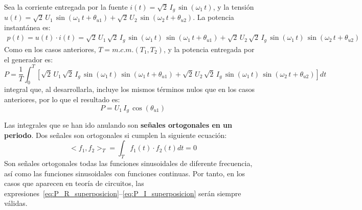 Sea la corriente entregada por la fuente
$i(t)=\sqrt{2}\,I_g\,\sin(\omega_1\,t)$, y la tensión
$u(t)=\sqrt{2}\,U_{1}\,\sin(\omega_1\,t+\theta_{u1})+\sqrt{2}\,U_{2}\,\sin(\omega_2\,t+\theta_{u2})$. La
potencia instantánea es:
\begin{align*}
  p(t) = u(t)\cdot i(t) = \sqrt{2}\,U_{1}\, \sqrt{2}\,I_g\,\sin(\omega_1\,t)\,\sin(\omega_1\,t+\theta_{u1}) + \sqrt{2}\,U_{2}\, \sqrt{2}\,I_g\,\sin(\omega_1\,t)\,\sin(\omega_2\,t+\theta_{u2})
\end{align*} 
Como en los casos anteriores, $T=m.c.m.(T_1,T_2)$, y la potencia
entregada por el generador es:
\begin{equation*}
  P=\dfrac{1}{T}\int_0^T \left[\sqrt{2}\,U_{1}\, \sqrt{2}\,I_g\,\sin(\omega_1\,t)\,\sin(\omega_1\,t+\theta_{u1})+\sqrt{2}\,U_{2}\, \sqrt{2}\,I_g\,\sin(\omega_1\,t)\,\sin(\omega_2\,t+\theta_{u2}) \right] dt
\end{equation*}
integral que, al desarrollarla, incluye los mismos términos nulos que
en los casos anteriores, por lo que el resultado es:
\begin{equation}\label{eq:P_I_superposicion}
  \boxed{P=U_1\,I_g\,\cos(\theta_{u1})}
\end{equation}
    
\begin{remark}
  Las integrales que se han ido anulando son \textbf{señales
    ortogonales en un periodo}. Dos señales son ortogonales si cumplen
  la siguiente ecuación:
  \begin{equation*}
    <f_1, f_2>_T = \int_T f_1(t) \cdot f_2(t) dt = 0
  \end{equation*}
  Son señales ortogonales todas las funciones sinusoidales de
  diferente frecuencia, así como las funciones sinusoidales con
  funciones continuas. Por tanto, en los casos que aparecen en teoría
  de circuitos, las
  expresiones~\eqref{eq:P_R_superposicion}--\eqref{eq:P_I_superposicion}
  serán siempre válidas.
\end{remark}

